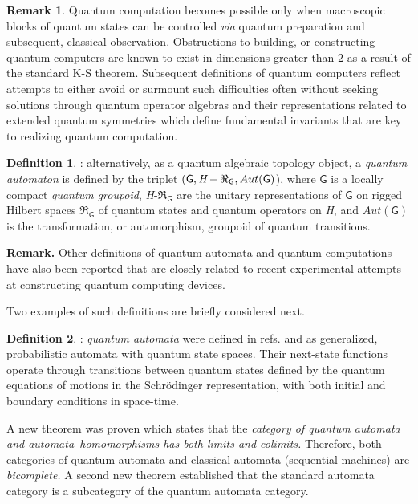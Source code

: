 \documentclass[12pt]{article}
\theoremstyle{plain}
\theoremstyle{definition}
\newtheorem{definition}{Definition}[section]
\newtheorem{remark}{Remark}[section]
\theoremstyle{plain}
\numberwithin{equation}{section}
\newcommand{\grp}{\mathsf{G}}
\begin{document}
\begin{remark} 
 Quantum computation becomes possible only when macroscopic blocks of quantum states can be controlled {\em via} quantum preparation and subsequent, classical observation. Obstructions to building, or constructing quantum computers are known to exist in dimensions greater than $2$ as a result of the standard K-S theorem. Subsequent definitions of quantum computers reflect attempts to either avoid or surmount such difficulties often without seeking solutions through quantum operator algebras and their representations related to extended quantum symmetries which define fundamental invariants that are key to realizing quantum computation.
\end{remark} 

\begin{definition}: alternatively, as a quantum algebraic topology object, a \emph{quantum automaton} is defined by the
triplet $(\grp,\emph{H}-\Re_{\grp}, Aut(\grp)$), where $\grp$ is a locally compact \emph{quantum groupoid}, 
\emph{H}-$\Re_{\grp}$ are the unitary representations of $\grp$ on rigged Hilbert spaces $\Re_\grp$ of quantum states and quantum operators on \emph{H}, and $Aut(\grp)$ is the transformation, or automorphism, groupoid of quantum transitions.
\end{definition}

\textbf{Remark.} Other definitions of quantum automata and quantum computations have also been reported that are
closely related to recent experimental attempts at constructing quantum computing devices. 

 Two examples of such definitions are briefly considered next.

\begin{definition}:  {\em quantum automata} were defined in refs.\cite{ICB71a} and \cite{ICB71b} as generalized, probabilistic automata with quantum state spaces. Their next-state functions operate through transitions between quantum states defined by the quantum equations of motions in the Schr\"{o}dinger representation, with both initial and boundary conditions in space-time.

A new theorem was proven which states that the \emph{category of quantum automata and automata--homomorphisms has both
limits and colimits.} Therefore, both categories of quantum automata and classical automata (sequential machines) are
\emph{bicomplete.} A second new theorem established that the standard automata category is a subcategory of the quantum
automata category. 
\end{definition}
\end{document}
